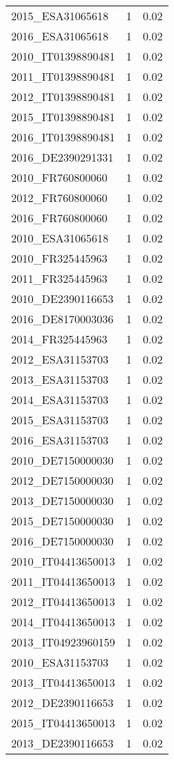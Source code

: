 \begin{table*}[htbp]
\begin{tabular}{lrr}
2015_ESA31065618 & 1 & 0.02 \\
2016_ESA31065618 & 1 & 0.02 \\
2010_IT01398890481 & 1 & 0.02 \\
2011_IT01398890481 & 1 & 0.02 \\
2012_IT01398890481 & 1 & 0.02 \\
2015_IT01398890481 & 1 & 0.02 \\
2016_IT01398890481 & 1 & 0.02 \\
2016_DE2390291331 & 1 & 0.02 \\
2010_FR760800060 & 1 & 0.02 \\
2012_FR760800060 & 1 & 0.02 \\
2016_FR760800060 & 1 & 0.02 \\
2010_ESA31065618 & 1 & 0.02 \\
2010_FR325445963 & 1 & 0.02 \\
2011_FR325445963 & 1 & 0.02 \\
2010_DE2390116653 & 1 & 0.02 \\
2016_DE8170003036 & 1 & 0.02 \\
2014_FR325445963 & 1 & 0.02 \\
2012_ESA31153703 & 1 & 0.02 \\
2013_ESA31153703 & 1 & 0.02 \\
2014_ESA31153703 & 1 & 0.02 \\
2015_ESA31153703 & 1 & 0.02 \\
2016_ESA31153703 & 1 & 0.02 \\
2010_DE7150000030 & 1 & 0.02 \\
2012_DE7150000030 & 1 & 0.02 \\
2013_DE7150000030 & 1 & 0.02 \\
2015_DE7150000030 & 1 & 0.02 \\
2016_DE7150000030 & 1 & 0.02 \\
2010_IT04413650013 & 1 & 0.02 \\
2011_IT04413650013 & 1 & 0.02 \\
2012_IT04413650013 & 1 & 0.02 \\
2014_IT04413650013 & 1 & 0.02 \\
2013_IT04923960159 & 1 & 0.02 \\
2010_ESA31153703 & 1 & 0.02 \\
2013_IT04413650013 & 1 & 0.02 \\
2012_DE2390116653 & 1 & 0.02 \\
2015_IT04413650013 & 1 & 0.02 \\
2013_DE2390116653 & 1 & 0.02 \\

\end{tabular}
\end{table*}
